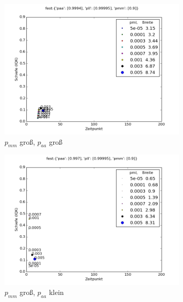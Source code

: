 \begin{figure}
\begin{subfigure}[t]{0.49\textwidth}
\includegraphics[width=\textwidth]{bilder/pml/pml_09_p_09994_099995}
\caption{$p_{mm}$ groß, $p_{aa}$ groß}
\end{subfigure}
\begin{subfigure}[t]{0.49\textwidth}
\includegraphics[width=\textwidth]{bilder/pml/pml_09_p_0997_099995}
\caption{$p_{mm}$ groß, $p_{aa}$ klein}
\end{subfigure}
\vspace*{7mm}
\begin{subfigure}[b]{0.49\textwidth}

\end{subfigure}
\end{figure}
